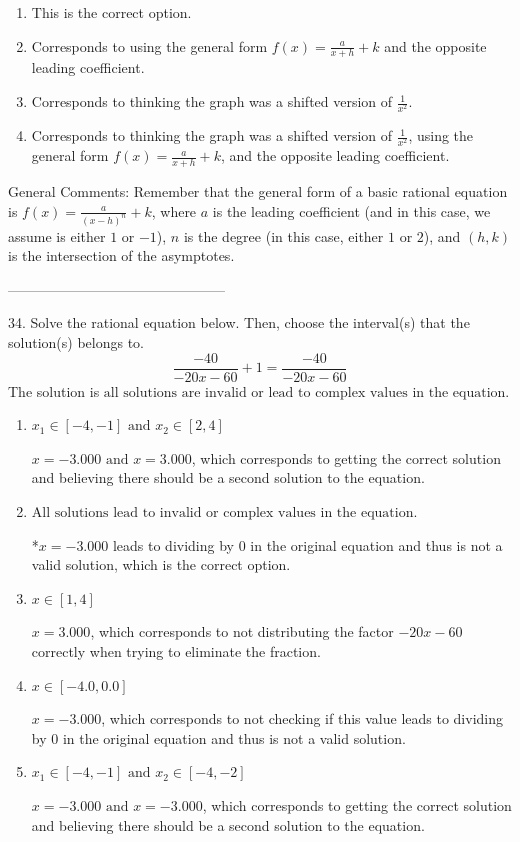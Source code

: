 \documentclass{extbook}[14pt]
\begin{document}
\begin{enumerate}[label=\Alph*.] 
\item This is the correct option.  
\item Corresponds to using the general form $f(x) = \frac{a}{x+h}+k$ and the opposite leading coefficient.  
\item Corresponds to thinking the graph was a shifted version of $\frac{1}{x^2}$.  
\item Corresponds to thinking the graph was a shifted version of $\frac{1}{x^2}$, using the general form $f(x) = \frac{a}{x+h}+k$, and the opposite leading coefficient.  
\end{enumerate} 
 
General Comments: Remember that the general form of a basic rational equation is $ f(x) = \frac{a}{(x-h)^n} + k$, where $a$ is the leading coefficient (and in this case, we assume is either $1$ or $-1$), $n$ is the degree (in this case, either $1$ or $2$), and $(h, k)$ is the intersection of the asymptotes.

-----------------------------------------------

34. Solve the rational equation below. Then, choose the interval(s) that the solution(s) belongs to.
\[ \frac{-40}{-20x -60} + 1 = \frac{-40}{-20x -60} \] 
The solution is $ \text{all solutions are invalid or lead to complex values in the equation.} $ 

\begin{enumerate}[label=\Alph*.] 
\item $ x_1 \in [-4, -1] \text{ and } x_2 \in [2,4] $ 

 $x = -3.000 \text{ and } x = 3.000$, which corresponds to getting the correct solution and believing there should be a second solution to the equation. 
\item $ \text{All solutions lead to invalid or complex values in the equation.} $ 

 *$x = -3.000$ leads to dividing by 0 in the original equation and thus is not a valid solution, which is the correct option. 
\item $ x \in [1,4] $ 

 $x = 3.000$, which corresponds to not distributing the factor $-20x -60$ correctly when trying to eliminate the fraction. 
\item $ x \in [-4.0,0.0] $ 

 $x = -3.000$, which corresponds to not checking if this value leads to dividing by 0 in the original equation and thus is not a valid solution. 
\item $ x_1 \in [-4, -1] \text{ and } x_2 \in [-4,-2] $ 

 $x = -3.000 \text{ and } x = -3.000$, which corresponds to getting the correct solution and believing there should be a second solution to the equation. 
\end{enumerate} 
 
\end{document}
